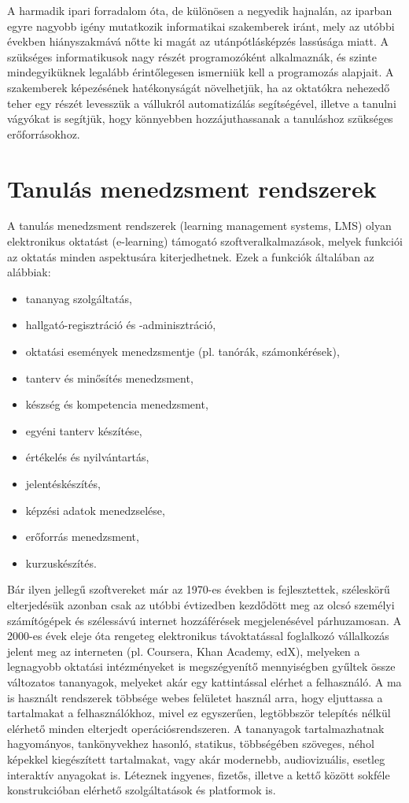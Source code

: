 A harmadik ipari forradalom óta, de különösen a negyedik hajnalán, az iparban egyre nagyobb igény mutatkozik informatikai szakemberek iránt, mely az utóbbi években hiányszakmává nőtte ki magát az utánpótlásképzés lassúsága miatt.
A szükséges informatikusok nagy részét programozóként alkalmaznák, és szinte mindegyiküknek legalább érintőlegesen ismerniük kell a programozás alapjait.
A szakemberek képezésének hatékonyságát növelhetjük, ha az oktatókra nehezedő teher egy részét levesszük a vállukról automatizálás segítségével, illetve a tanulni vágyókat is segítjük, hogy könnyebben hozzájuthassanak a tanuláshoz szükséges erőforrásokhoz.

\section*{Tanulás menedzsment rendszerek}
A tanulás menedzsment rendszerek (learning management systems, LMS) olyan elektronikus oktatást (e-learning) támogató szoftveralkalmazások, melyek funkciói az oktatás minden aspektusára kiterjedhetnek.
Ezek a funkciók általában az alábbiak:
\begin{itemize}
    \item tananyag szolgáltatás,
    \item hallgató-regisztráció és -adminisztráció,
    \item oktatási események menedzsmentje (pl. tanórák, számonkérések),
    \item tanterv és minősítés menedzsment,
    \item készség és kompetencia menedzsment,
    \item egyéni tanterv készítése,
    \item értékelés és nyilvántartás,
    \item jelentéskészítés,
    \item képzési adatok menedzselése,
    \item erőforrás menedzsment,
    \item kurzuskészítés.
\end{itemize}
Bár ilyen jellegű szoftvereket már az 1970-es években is fejlesztettek, széleskörű elterjedésük azonban csak az utóbbi évtizedben kezdődött meg az olcsó személyi számítógépek és szélessávú internet hozzáférések megjelenésével párhuzamosan.
A 2000-es évek eleje óta rengeteg elektronikus távoktatással foglalkozó vállalkozás jelent meg az interneten (pl. Coursera, Khan Academy, edX), melyeken a legnagyobb oktatási intézményeket is megszégyenítő mennyiségben gyűltek össze változatos tananyagok, melyeket akár egy kattintással elérhet a felhasználó.  %
A ma is használt rendszerek többsége webes felületet használ arra, hogy eljuttassa a tartalmakat a felhasználókhoz, mivel ez egyszerűen, legtöbbször telepítés nélkül elérhető minden elterjedt operációsrendszeren.
A tananyagok tartalmazhatnak hagyományos, tankönyvekhez hasonló, statikus, többségében szöveges, néhol képekkel kiegészített tartalmakat, vagy akár modernebb, audiovizuális, esetleg interaktív anyagokat is.
Léteznek ingyenes, fizetős, illetve a kettő között sokféle konstrukcióban elérhető szolgáltatások és platformok is.

